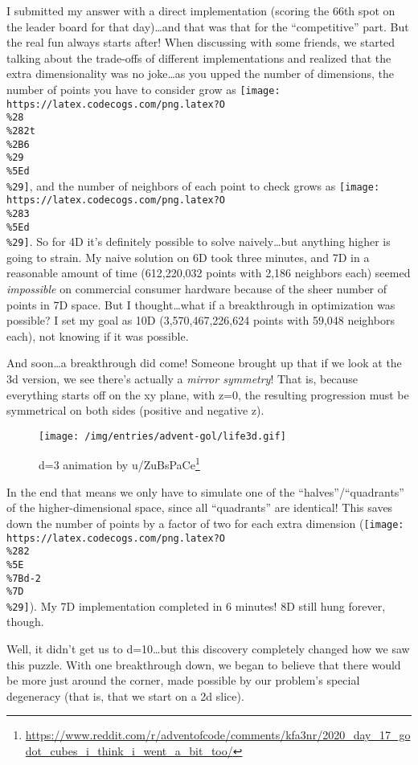 \documentclass[]{article}
\renewcommand{\href}[2]{#2\footnote{\url{#1}}}
\begin{document}
I submitted my answer with a direct implementation (scoring the 66th spot on the
leader board for that day)\ldots and that was that for the ``competitive'' part.
But the real fun always starts after! When discussing with some friends, we
started talking about the trade-offs of different implementations and realized
that the extra dimensionality was no joke\ldots as you upped the number of
dimensions, the number of points you have to consider grow as
\texttt{[image: https://latex.codecogs.com/png.latex?O\\\%28\\\%282t\\\%2B6\\\%29\\\%5Ed\\\%29]},
and the number of neighbors of each point to check grows as
\texttt{[image: https://latex.codecogs.com/png.latex?O\\\%283\\\%5Ed\\\%29]}. So for
4D it's definitely possible to solve naively\ldots but anything higher is going
to strain. My naive solution on 6D took three minutes, and 7D in a reasonable
amount of time (612,220,032 points with 2,186 neighbors each) seemed
\emph{impossible} on commercial consumer hardware because of the sheer number of
points in 7D space. But I thought\ldots what if a breakthrough in optimization
was possible? I set my goal as 10D (3,570,467,226,624 points with 59,048
neighbors each), not knowing if it was possible.

And soon\ldots a breakthrough did come! Someone brought up that if we look at
the 3d version, we see there's actually a \emph{mirror symmetry}! That is,
because everything starts off on the xy plane, with z=0, the resulting
progression must be symmetrical on both sides (positive and negative z).

\begin{figure}
\centering
\texttt{[image: /img/entries/advent-gol/life3d.gif]}
\caption{d=3 animation by
\href{https://www.reddit.com/r/adventofcode/comments/kfa3nr/2020_day_17_godot_cubes_i_think_i_went_a_bit_too/}{u/ZuBsPaCe}}
\end{figure}

In the end that means we only have to simulate one of the
``halves''/``quadrants'' of the higher-dimensional space, since all
``quadrants'' are identical! This saves down the number of points by a factor of
two for each extra dimension
(\texttt{[image: https://latex.codecogs.com/png.latex?O\\\%282\\\%5E\\\%7Bd-2\\\%7D\\\%29]}).
My 7D implementation completed in 6 minutes! 8D still hung forever, though.

Well, it didn't get us to d=10\ldots but this discovery completely changed how
we saw this puzzle. With one breakthrough down, we began to believe that there
would be more just around the corner, made possible by our problem's special
degeneracy (that is, that we start on a 2d slice).
\end{document}
